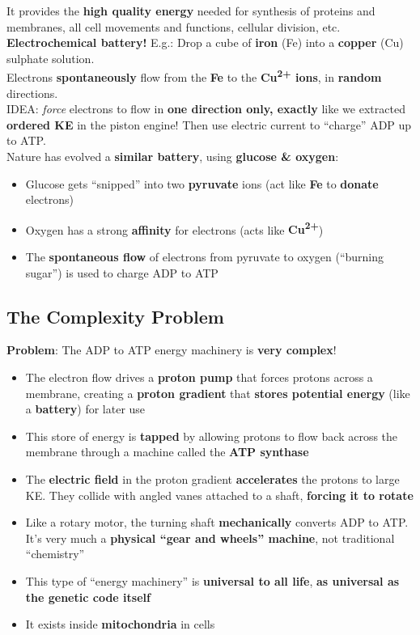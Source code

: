 \documentclass[12pt]{article}
\theoremstyle{definition}
\begin{document}
It provides the \textbf{high quality energy} needed for synthesis of proteins and membranes, all cell movements and functions, cellular division, etc. \\

\textbf{Electrochemical battery!} E.g.: Drop a cube of \textbf{iron} (Fe) into a \textbf{copper} (Cu) sulphate solution. \\
Electrons \textbf{spontaneously} flow from the \textbf{Fe} to the \textbf{Cu\textsuperscript{2+} ions}, in \textbf{random} directions. \\
IDEA: \emph{force} electrons to flow in \textbf{one direction only, exactly} like we extracted \textbf{ordered KE} in the piston engine!
Then use electric current to ``charge'' ADP up to ATP. \\

Nature has evolved a \textbf{similar battery}, using \textbf{glucose \& oxygen}:
\begin{itemize}
  \item Glucose gets ``snipped'' into two \textbf{pyruvate} ions (act like \textbf{Fe} to \textbf{donate} electrons)
  \item Oxygen has a strong \textbf{affinity} for electrons (acts like \textbf{Cu\textsuperscript{2+}})
  \item The \textbf{spontaneous flow} of electrons from pyruvate to oxygen (``burning sugar'') is used to charge ADP to ATP
\end{itemize}

\subsection{The Complexity Problem}
\textbf{Problem}: The ADP to ATP energy machinery is \textbf{very complex}!
\begin{itemize}
  \item The electron flow drives a \textbf{proton pump} that forces protons across a membrane, creating a \textbf{proton gradient} that \textbf{stores potential energy} (like a \textbf{battery}) for later use
  \item This store of energy is \textbf{tapped} by allowing protons to flow back across the membrane through a machine called the \textbf{ATP synthase}
  \item The \textbf{electric field} in the proton gradient \textbf{accelerates} the protons to large KE.
  They collide with angled vanes attached to a shaft, \textbf{forcing it to rotate}
  \item Like a rotary motor, the turning shaft \textbf{mechanically} converts ADP to ATP.
  It's very much a \textbf{physical ``gear and wheels'' machine}, not traditional ``chemistry''
  \item This type of ``energy machinery'' is \textbf{universal to all life}, \textbf{as universal as the genetic code itself}
  \item It exists inside \textbf{mitochondria} in cells
\end{itemize}
\end{document}
